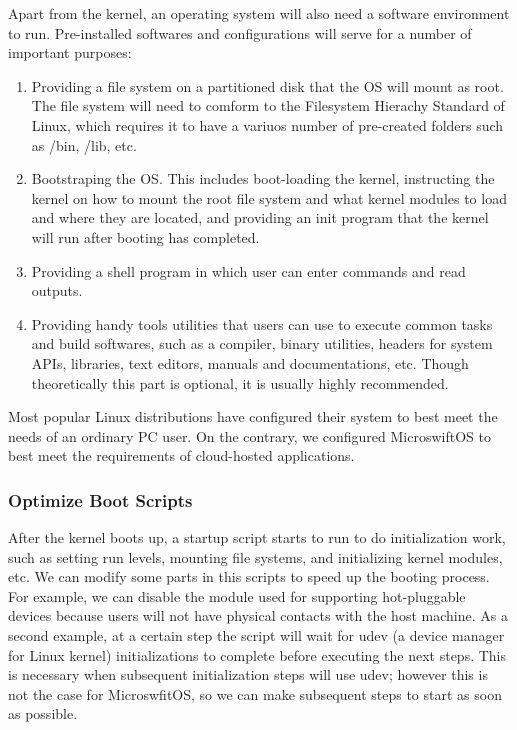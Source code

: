 Apart from the kernel, an operating system will also need a software environment to run. Pre-installed softwares and configurations will serve for a number of important purposes: 
\begin{enumerate}
\item
Providing a file system on a partitioned disk that the OS will mount as root. The file system will need to comform to the Filesystem Hierachy Standard of Linux, which requires it to have a variuos number of pre-created folders such as /bin, /lib, etc.
\item
Bootstraping the OS. This includes boot-loading the kernel, instructing the kernel on how to mount the root file system and what kernel modules to load and where they are located, and providing an init program that the kernel will run after booting has completed.
\item
Providing a shell program in which user can enter commands and read outputs.
\item
Providing handy tools utilities that users can use to execute common tasks and build softwares, such as a compiler, binary utilities, headers for system APIs, libraries, text editors, manuals and documentations, etc. Though theoretically this part is optional, it is usually highly recommended.
\end{enumerate}

Most popular Linux distributions have configured their system to best meet the needs of an ordinary PC user. On the contrary, we configured MicroswiftOS to best meet the requirements of cloud-hosted applications. 

\subsubsection{Optimize Boot Scripts}
After the kernel boots up, a startup script starts to run to do initialization work, such as setting run levels, mounting file systems, and initializing kernel modules, etc. We can modify some parts in this scripts to speed up the booting process. For example, we can disable the module used for supporting hot-pluggable devices because users will not have physical contacts with the host machine. As a second example, at a certain step the script will wait for udev (a device manager for Linux kernel) initializations to complete before executing the next steps. This is necessary when subsequent initialization steps will use udev; however this is not the case for MicroswfitOS, so we can make subsequent steps to start as soon as possible.

